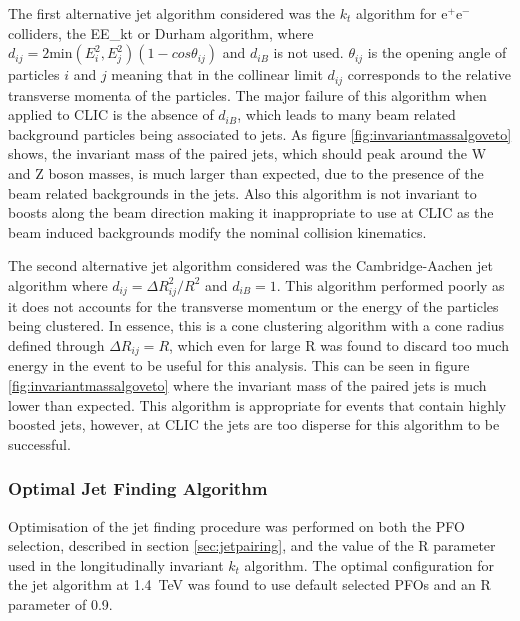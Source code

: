 The first alternative jet algorithm considered was the $k_{t}$ algorithm for $\text{e}^{+}\text{e}^{-}$ colliders, the EE\_kt or Durham algorithm, where $d_{ij} = 2\text{min}(E_{i}^{2}, E_{j}^{2})(1-cos\theta_{ij})$ and $d_{iB}$ is not used.  $\theta_{ij}$ is the opening angle of particles $i$ and $j$ meaning that in the collinear limit $d_{ij}$ corresponds to the relative transverse momenta of the particles.  The major failure of this algorithm when applied to CLIC is the absence of $d_{iB}$, which leads to many beam related background particles being associated to jets.  As figure \ref{fig:invariantmassalgoveto} shows, the invariant mass of the paired jets, which should peak around the W and Z boson masses, is much larger than expected, due to the presence of the beam related backgrounds in the jets.  Also this algorithm is not invariant to boosts along the beam direction making it inappropriate to use at CLIC as the beam induced backgrounds modify the nominal collision kinematics.  

The second alternative jet algorithm considered was the Cambridge-Aachen jet algorithm where $d_{ij} = {\Delta}R_{ij}^{2}/R^2$ and $d_{iB} = 1$.  This algorithm performed poorly as it does not accounts for the transverse momentum or the energy of the particles being clustered. In essence, this is a cone clustering algorithm with a cone radius defined through ${\Delta}R_{ij} = R$, which even for large R was found to discard too much energy in the event to be useful for this analysis.  This can be seen in figure \ref{fig:invariantmassalgoveto} where the invariant mass of the paired jets is much lower than expected.  This algorithm is appropriate for events that contain highly boosted jets, however, at CLIC the jets are too disperse for this algorithm to be successful.


\subsubsection{Optimal Jet Finding Algorithm}
\label{sec:optimaljetalgorithm}
Optimisation of the jet finding procedure was performed on both the PFO selection, described in section \ref{sec:jetpairing}, and the value of the R parameter used in the longitudinally invariant $k_{t}$ algorithm.   The optimal configuration for the jet algorithm at 1.4~TeV was found to use default selected PFOs and an R parameter of 0.9.

